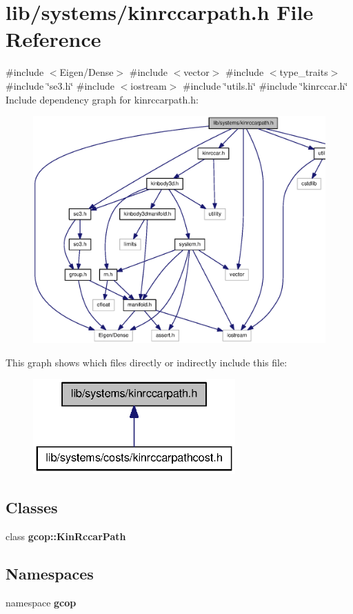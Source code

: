 \section{lib/systems/kinrccarpath.h \-File \-Reference}
\label{kinrccarpath_8h}
{\ttfamily \#include $<$\-Eigen/\-Dense$>$}\*
{\ttfamily \#include $<$vector$>$}\*
{\ttfamily \#include $<$type\-\_\-traits$>$}\*
{\ttfamily \#include \char`\"{}se3.\-h\char`\"{}}\*
{\ttfamily \#include $<$iostream$>$}\*
{\ttfamily \#include \char`\"{}utils.\-h\char`\"{}}\*
{\ttfamily \#include \char`\"{}kinrccar.\-h\char`\"{}}\*
\-Include dependency graph for kinrccarpath.\-h\-:
\nopagebreak
\begin{figure}[H]
\begin{center}
\leavevmode
\includegraphics[width=350pt]{kinrccarpath_8h__incl}
\end{center}
\end{figure}
\-This graph shows which files directly or indirectly include this file\-:
\nopagebreak
\begin{figure}[H]
\begin{center}
\leavevmode
\includegraphics[width=220pt]{kinrccarpath_8h__dep__incl}
\end{center}
\end{figure}
\subsection*{\-Classes}
\begin{DoxyCompactItemize}
\item 
class {\bf gcop\-::\-Kin\-Rccar\-Path}
\end{DoxyCompactItemize}
\subsection*{\-Namespaces}
\begin{DoxyCompactItemize}
\item 
namespace {\bf gcop}
\end{DoxyCompactItemize}
